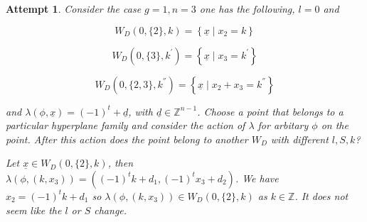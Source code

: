 \documentclass[a4paper,12pt]{article}
\newtheorem{attempt}{Attempt}
\theoremstyle{definition}
\theoremstyle{indented}
\begin{document}
\begin{attempt}

Consider the case $g=1,n=3$ one has the following, $l=0$ and

$$W_D(0,\{2\}, k) = \left\{ \underline{x} \mid x_2=k\right\} $$

$$W_D(0,\{3\}, k^{'}) = \left\{ \underline{x} \mid x_3=k^{'}\right\} $$


$$W_D(0,\{2,3\}, k^{''}) = \left\{ \underline{x} \mid x_2 + x_3= k^{''}\right\} $$

and $\lambda(\phi, \underline{x}) = (-1)^t + \underline{d}$, with $\underline{d} \in \mathbb{Z}^{n-1}$. Choose a point that belongs to a particular hyperplane family and consider the action of $\lambda$ for arbitary $\phi$ on the point. After this action does the point belong to another $W_D$ with different $l,S,k$? 

\hfill \break

Let $ \underline{x} \in W_D(0,\{2\}, k)$, then $\lambda (\phi, (k,x_3) ) = ( (-1)^{t} k +d_1,  (-1)^{t} x_3 +d_2 ) $. We have $x_2 = (-1)^{t} k +d_1$ so $\lambda (\phi, (k,x_3) ) \in W_D(0,\{2\}, k)$ as $k \in \mathbb{Z}$. It does not seem like the $l$ or $S$ change.
\end{attempt}
\end{document}
